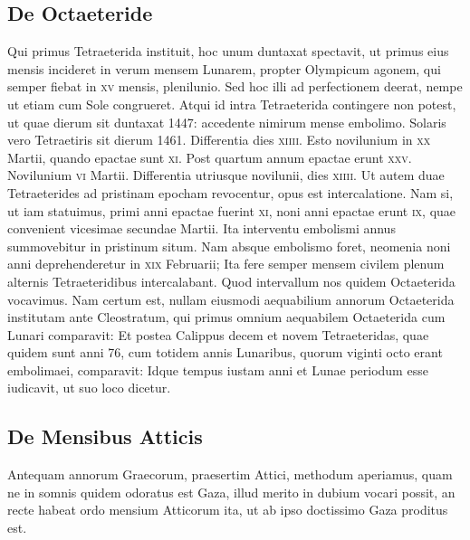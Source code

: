 \subsection{De Octaeteride}
Qui primus Tetraeterida instituit, hoc unum duntaxat spectavit,
ut primus eius mensis incideret in verum mensem Lunarem,
propter Olympicum agonem, qui semper fiebat in \textsc{xv}
mensis, plenilunio.
Sed hoc illi ad perfectionem deerat, nempe ut etiam
cum Sole congrueret.
Atqui id intra Tetraeterida contingere non potest,
ut quae dierum sit duntaxat 1447: accedente nimirum mense embolimo.
Solaris vero Tetraetiris sit dierum 1461.
Differentia dies \textsc{xiiii}.
Esto novilunium in \textsc{xx} Martii, quando epactae sunt \textsc{xi}.
Post quartum
annum epactae erunt \textsc{xxv}.
Novilunium \textsc{vi} Martii.
Differentia
utriusque novilunii, dies \textsc{xiiii}.
Ut autem duae Tetraeterides ad pristinam
epocham revocentur, opus est intercalatione.
Nam si, ut iam
statuimus, primi anni epactae fuerint \textsc{xi},
 noni anni epactae erunt \textsc{ix},
quae convenient vicesimae secundae Martii.
Ita interventu embolismi
annus summovebitur in pristinum situm.
Nam absque embolismo
foret, neomenia noni anni deprehenderetur in \textsc{xix} Februarii;
Ita fere
semper mensem civilem plenum alternis Tetraeteridibus intercalabant.
Quod intervallum nos quidem Octaeterida vocavimus.
Nam
certum est, nullam eiusmodi aequabilium annorum Octaeterida institutam
ante Cleostratum, qui primus omnium aequabilem Octaeterida
cum Lunari comparavit:
Et postea Calippus decem et novem
Tetraeteridas, quae quidem sunt anni 76, cum totidem annis Lunaribus,
quorum viginti octo erant embolimaei, comparavit:
Idque
tempus iustam anni et Lunae periodum esse iudicavit, ut suo loco dicetur.

\subsection{De Mensibus Atticis}
Antequam annorum Graecorum, praesertim Attici, methodum
aperiamus, quam ne in somnis quidem odoratus est Gaza,
illud merito in dubium vocari possit, an recte habeat ordo mensium
Atticorum ita, ut ab ipso doctissimo Gaza proditus est.

